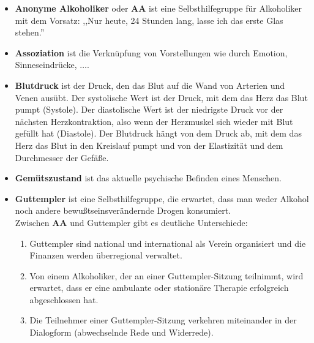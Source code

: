 \documentclass[10pt,a4paper]{article}
\newcommand\emps[1] {{\color {indigo(web)} {\bf #1}}}          %
\begin{document}
\begin{mdframed}[style=daystyle, leftmargin=-25pt]
  \begin{itemize}
    \setlength\itemsep{-3pt}

  \item {\emps {Anonyme Alkoholiker}} oder {\emps {AA}} ist eine
    Selbsthilfegruppe für Alkoholiker mit dem Vorsatz:
    ,,Nur heute, 24 Stunden lang, lasse ich das erste Glas stehen.''
    
  \item {\emps {Assoziation}} ist die Verknüpfung von Vorstellungen wie durch
    Emotion, Sinneseindrücke, $\ldots$.

  \item {\emps {Blutdruck}} ist der Druck, den das Blut auf die Wand von
    Arterien und Venen ausübt. Der systolische Wert ist der Druck, mit dem das
    Herz das Blut pumpt (Systole). Der diastolische Wert ist der niedrigste
    Druck vor der nächsten Herzkontraktion, also wenn der Herzmuskel sich wieder
    mit Blut gefüllt hat (Diastole). Der Blutdruck hängt von dem Druck ab, mit
    dem das Herz das Blut in den Kreislauf pumpt und von der Elastizität und dem
    Durchmesser der Gefäße.

  \item {\emps {Gemütszustand}} ist das aktuelle psychische Befinden eines
    Menschen.

  \item {\emps {Guttempler}} ist eine Selbsthilfegruppe, die erwartet, dass man
    weder Alkohol noch andere bewußtseinsverändernde Drogen konsumiert. \\
    Zwischen {\bf AA} und Guttempler gibt es deutliche Unterschiede:

    \begin{mdframed}[style=daystyle, leftmargin=-25pt]
      \begin{enumerate}
        \setlength\itemsep{-3pt}
        
      \item Guttempler sind national und international als Verein organisiert und die
        Finanzen werden überregional verwaltet.
          
      \item Von einem Alkoholiker, der an einer Guttempler-Sitzung teilnimmt, wird
        erwartet, dass er eine ambulante oder stationäre Therapie erfolgreich
        abgeschlossen hat.
          
      \item Die Teilnehmer einer Guttempler-Sitzung verkehren miteinander in der
        Dialogform (abwechselnde Rede und Widerrede).
          

\end{enumerate}
\end{mdframed}
\end{itemize}
\end{mdframed}
\end{document}
